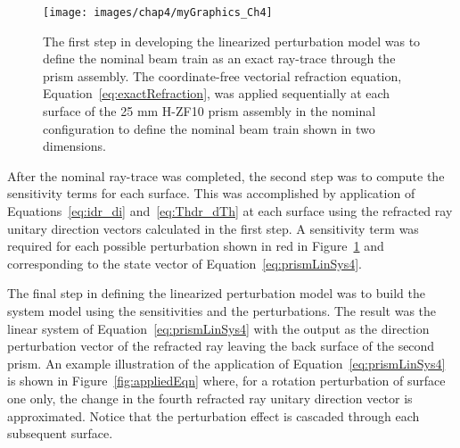 \begin{figure}[htb]		%
\centering
\texttt{[image: images/chap4/myGraphics\_Ch4]}
\caption{The first step in developing the linearized perturbation model was to define the nominal beam train as an exact ray-trace through the prism assembly. The coordinate-free vectorial refraction equation, Equation~\eqref{eq:exactRefraction}, was applied sequentially at each surface of the 25 mm H-ZF10 prism assembly in the nominal configuration to define the nominal beam train shown in two dimensions.}
\label{fig:nomRayTrace}
\end{figure}

After the nominal ray-trace was completed, the second step was to compute the sensitivity terms for each surface. This was accomplished by application of Equations~\eqref{eq:idr_di} and~\eqref{eq:Thdr_dTh} at each surface using the refracted ray unitary direction vectors calculated in the first step. A sensitivity term was required for each possible perturbation shown in red in Figure~\ref{fig:nomRayTrace} and corresponding to the state vector of Equation~\eqref{eq:prismLinSys4}.

The final step in defining the linearized perturbation model was to build the system model using the sensitivities and the perturbations. The result was the linear system of Equation~\eqref{eq:prismLinSys4} with the output as the direction perturbation vector of the refracted ray leaving the back surface of the second prism. An example illustration of the application of Equation~\eqref{eq:prismLinSys4} is shown in Figure~\ref{fig:appliedEqn} where, for a rotation perturbation of surface one only, the change in the fourth refracted ray unitary direction vector is approximated. Notice that the perturbation effect is cascaded through each subsequent surface.

